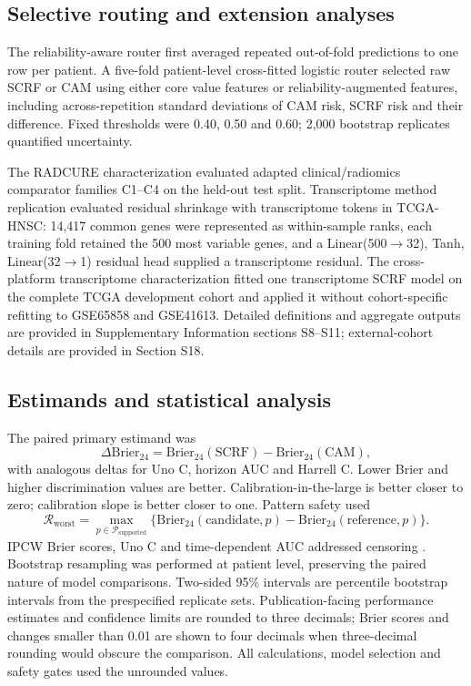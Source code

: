 \documentclass[pdflatex,sn-nature]{sn-jnl}
\begin{document}
\subsection{Selective routing and extension analyses}
The reliability-aware router first averaged repeated out-of-fold predictions to one row per patient. A five-fold patient-level cross-fitted logistic router selected raw SCRF or CAM using either core value features or reliability-augmented features, including across-repetition standard deviations of CAM risk, SCRF risk and their difference. Fixed thresholds were 0.40, 0.50 and 0.60; 2,000 bootstrap replicates quantified uncertainty.

The RADCURE characterization evaluated adapted clinical/radiomics comparator families C1--C4 on the held-out test split. Transcriptome method replication evaluated residual shrinkage with transcriptome tokens in TCGA-HNSC: 14,417 common genes were represented as within-sample ranks, each training fold retained the 500 most variable genes, and a Linear(500$\rightarrow$32), Tanh, Linear(32$\rightarrow$1) residual head supplied a transcriptome residual. The cross-platform transcriptome characterization fitted one transcriptome SCRF model on the complete TCGA development cohort and applied it without cohort-specific refitting to GSE65858 and GSE41613. Detailed definitions and aggregate outputs are provided in Supplementary Information sections S8--S11; external-cohort details are provided in Section S18.

\subsection{Estimands and statistical analysis}
The paired primary estimand was
\begin{equation}
\Delta\mathrm{Brier}_{24}=\mathrm{Brier}_{24}(\mathrm{SCRF})-\mathrm{Brier}_{24}(\mathrm{CAM}),
\end{equation}
with analogous deltas for Uno C, horizon AUC and Harrell C. Lower Brier and higher discrimination values are better. Calibration-in-the-large is better closer to zero; calibration slope is better closer to one. Pattern safety used
\begin{equation}
\mathcal{R}_{\mathrm{worst}}=\max_{p\in\mathcal{P}_{\mathrm{supported}}}
\{\mathrm{Brier}_{24}(\mathrm{candidate},p)-\mathrm{Brier}_{24}(\mathrm{reference},p)\}.
\end{equation}
IPCW Brier scores, Uno C and time-dependent AUC addressed censoring \cite{graf1999,gerds2006,heagerty2000,uno2011}. Bootstrap resampling was performed at patient level, preserving the paired nature of model comparisons. Two-sided 95\% intervals are percentile bootstrap intervals from the prespecified replicate sets. Publication-facing performance estimates and confidence limits are rounded to three decimals; Brier scores and changes smaller than 0.01 are shown to four decimals when three-decimal rounding would obscure the comparison. All calculations, model selection and safety gates used the unrounded values.
\end{document}
